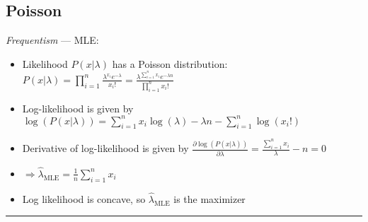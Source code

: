 \subsection*{Poisson}
\emph{Frequentism} --- 
MLE:
\begin{itemize}
    \item Likelihood $P(x | \lambda)$ has a Poisson distribution:  $P(x | \lambda) = \prod_{i=1}^{n} \frac{\lambda^{x_i} e^{-\lambda}}{x_i!} = \frac{\lambda^{ \sum_{i=1}^{n} x_i} e^{-\lambda n}}{ \prod_{i=1}^{n} x_i!}$
    \item Log-likelihood is given by $ \log(P(x | \lambda)) = \sum_{i=1}^{n} x_i \log(\lambda) - \lambda n - \sum_{i=1}^{n} \log(x_i!)$
    \item Derivative of log-likelihood is given by $\frac{\partial \log(P(x | \lambda))}{\partial \lambda} = \frac{\sum_{i=1}^{n} x_i}{\lambda} - n = 0$
    \item $ \Rightarrow \hat{\lambda}_{\textrm{MLE}} = \frac{1}{n} \sum_{i=1}^{n} x_i$
    \item Log likelihood is concave, so $\hat{\lambda}_{\textrm{MLE}}$ is the maximizer
\end{itemize}

{\color{lightgray}\hrule height 0.001mm}

